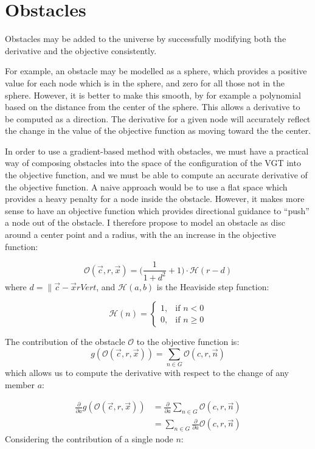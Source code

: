 \documentclass[11pt]{article}
\begin{document}
\section{Obstacles}

Obstacles may be added to the universe by successfully modifying both the derivative and the objective consistently.

For example, an obstacle may be modelled as a sphere, which provides a positive value for each node which is in the sphere,
and zero for all those not in the sphere.  However, it is better to make this smooth, by for example a polynomial
based on the distance from the center of the sphere.  This allows a derivative to be computed as a direction.
The derivative for a given node will accurately reflect the change in the value of the objective function as moving
toward the the center.

In order to use a gradient-based method with obstacles, we must have a practical way of composing obstacles into the
space of the configuration of the VGT into the objective function, and we must be able to compute an accurate derivative
of the objective function. A naive approach would be to use a flat space which provides a heavy penalty for a node
inside the obstacle. However, it makes more sense to have an objective function which provides directional guidance
to ``push'' a node out of the obstacle. I therefore propose to model an obstacle as disc around a center point and
a radius, with the an increase in the objective function:

\[
\mathcal{O}(\overrightarrow{c},r,\overrightarrow{x}) = \big( \frac{1}{1 + d^2} + 1\big) \cdot \mathcal{H}(r-d)
\]
where $d = \lVert \overrightarrow{c} - \overrightarrow{x} rVert $, and $\mathcal{H}(a,b)$ is the Heaviside step function:

\[
\mathcal{H}(n) =
\begin{cases}
1, & \text{if } n < 0  \\
0, & \text{if } n \geq 0
\end{cases}
\]

The contribution of the obstacle $\mathcal{O}$ to the objective function is:
\[
g(\mathcal{O}(\overrightarrow{c},r,\overrightarrow{x})) = \sum\limits_{n\in G} \mathcal{O}(c,r,\overrightarrow{n})
\]
which allows us to compute the derivative with respect to the change of any member $a$:

\begin{align*}
  \frac{\partial}{\partial a} g(\mathcal{O}(\overrightarrow{c},r,\overrightarrow{x})) &= \frac{\partial}{\partial a} \sum\limits_{n\in G} \mathcal{O}(c,r,\overrightarrow{n}) \\
  &= \sum\limits_{n\in G} \frac{\partial}{\partial a}  \mathcal{O}(c,r,\overrightarrow{n})
\end{align*}
Considering the contribution of a single node $n$:
\end{document}
